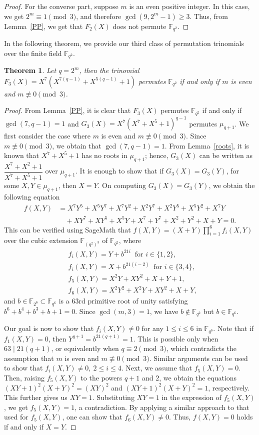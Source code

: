 \documentclass[12pt,reqno]{amsart}
\newtheorem{thm}{Theorem}[section]
\numberwithin{equation}{section}
\theoremstyle{definition}
\newcommand{\F}{\mathbb F}
\begin{document}
\begin{proof}
For the converse part, suppose $m$ is an even positive integer. In this case, we get $2^{m} \equiv 1 \pmod{3}$, and therefore $\gcd(9, 2^m - 1) \geq 3$. Thus, from Lemma~\ref{PP}, we get that $F_2(X)$ does not permute $\F_{q^2}$. 

\end{proof}

In the following theorem, we provide our third class of permutation trinomials over the finite field $\F_{q^2}$.
\begin{thm}\label{T3}
Let $q=2^m$, then the trinomial $F_{3}(X)=X^{7}(X^{7(q-1)} + X^{5(q-1)} + 1)$ permutes $\F_{q^2}$ if and only if $m$ is even and $m \not \equiv 0 \pmod 3$.
\end{thm}
\begin{proof}
From Lemma~\ref{PP}, it is clear that $F_3(X)$ permutes $\F_{q^2}$ if and only if $\gcd(7, q-1) = 1$ and $G_3(X)=X^{7}(X^{7}+X^5+1)^{q-1}$ permutes $\mu_{q+1}$. We first consider the case where $m$ is even and $m \not \equiv 0 \pmod 3$. 
Since $m\not\equiv 0 \pmod{3}$, we obtain that $\gcd(7,q-1)=1$. From Lemma~\ref{roots}, it is known that $X^{7}+X^{5}+1 $ has no roots in $\mu_{q+1}$; hence, $G_3(X)$ can be written as $\dfrac{X^7+X^2+1}{X^7+X^5+1}$ over $\mu_{q+1}$. It is enough to show that if $G_3(X) = G_3(Y)$, for some $X, Y \in \mu_{q+1}$, then $X=Y$. On computing $G_3(X)=G_3(Y)$, we obtain the following equation
\begin{align*}
f(X,Y) & = X^7Y^5+X^5Y^7+X^7Y^2+X^2Y^7+X^2Y^5+X^5Y^2+X^7Y \\&  
\quad + XY^7 + XY^5   +X^5Y + X^7+Y^7+X^2+Y^2+X+Y=0.
\end{align*}
This can be verified using SageMath that $f(X, Y)= (X + Y) \prod_{i=1}^{6} f_i(X, Y)$ over the cubic extension $\F_{(q^2)^3}$ of $\F_{q^2}$, where 
\begin{align*}
		&f_i(X,Y)=Y+b^{21 i}~ \mbox{ for } i\in\{1,2\},\\&
		f_i(X,Y)=X+b^{21(i-2)} ~\mbox{ for }i\in\{3,4\},\\&
		f_5(X,Y)=X^2Y+XY^2+X+Y+1,\\&
		f_6(X,Y)=X^2Y^2+X^2Y+XY^2+X+Y,
\end{align*}
and $b \in \F_{2^6} \subset \F_{q^6}$ is a $63\text{rd}$ primitive root of unity satisfying $b^6+b^4 + b^3 + b+1 = 0$. Since $\gcd(m,3)=1$, we have $b \not \in \F_{q^2}$ but $b \in \F_{q^6}$. 
    
Our goal is now to show that $f_i(X, Y) \ne 0$ for any $1 \leq i \leq 6$ in $\F_{q^6}$. Note that if $f_1(X,Y) = 0$, then $Y^{q+1} = b^{21(q+1)} = 1$. This is possible only when $63 \mid 21(q+1)$, or equivalently when $q \equiv 2 \pmod 3$, which contradicts the assumption that $m$ is even and $m \not \equiv 0 \pmod 3$. Similar arguments can be used to show that $f_i(X,Y) \ne 0,~ 2 \leq i \leq 4$. Next, we assume that $f_5(X,Y)=0$. Then, raising $f_5(X,Y)$ to the powers $q+1$ and $2$, we obtain the equations $(XY+1)^2(X+Y)^2=(XY)^2$ and $(XY+1)^2(X+Y)^2=1$, respectively. This further gives us $XY=1$. Substituting $XY=1$ in the expression of $f_5(X,Y)$, we get $f_5(X,Y)=1$, a contradiction. By applying a similar approach to that used for $f_5(X,Y)$, one can show that $f_6(X, Y) \ne 0$. Thus, $f(X, Y)=0$ holds if and only if $X=Y$.


\end{proof}
\end{document}
